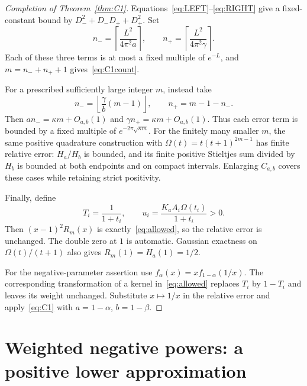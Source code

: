 \documentclass[11pt]{article}
\numberwithin{equation}{section}
\begin{document}
\begin{proof}[Completion of Theorem~\ref{thm:C1}]
Equations~\eqref{eq:LEFT}--\eqref{eq:RIGHT} give a fixed-constant bound
by $D_-^2+D_-D_++D_+^2$. Set
\begin{equation}\label{eq:allocationL}
 n_-=\left\lceil\frac{L^2}{4\pi^2a}\right\rceil,
 \qquad n_+=\left\lceil\frac{L^2}{4\pi^2\gamma}\right\rceil.
\end{equation}
Each of these three terms is at most a fixed multiple of $e^{-L}$,
and $m=n_-+n_++1$ gives~\eqref{eq:C1count}.

For a prescribed sufficiently large integer $m$, instead take
\[
 n_-=\left\lfloor\frac\gamma b(m-1)\right\rfloor,
 \qquad n_+=m-1-n_-.
\]
Then $a n_- =\kappa m+O_{a,b}(1)$ and
$\gamma n_+=\kappa m+O_{a,b}(1)$. Thus each error term is bounded by
a fixed multiple of $e^{-2\pi\sqrt{\kappa m}}$.
For the finitely many smaller $m$, the same positive quadrature
construction with $\Omega(t)=t(t+1)^{2m-1}$ has finite relative error:
$H_a/H_b$ is bounded, and its finite positive Stieltjes sum divided by
$H_b$ is bounded at both endpoints and on compact intervals.
Enlarging $C_{a,b}$ covers these cases while retaining strict positivity.

Finally, define
\[
 T_i=\frac1{1+t_i},\qquad
 u_i=\frac{K_a A_i\Omega(t_i)}{1+t_i}>0.
\]
Then $(x-1)^2R_m(x)$ is exactly~\eqref{eq:allowed}, so the relative
error is unchanged. The double zero at $1$ is automatic. Gaussian
exactness on $\Omega(t)/(t+1)$ also gives $R_m(1)=H_a(1)=1/2$.

For the negative-parameter assertion use
$f_\alpha(x)=x f_{1-\alpha}(1/x)$. The corresponding transformation
of a kernel in~\eqref{eq:allowed} replaces $T_i$ by $1-T_i$ and
leaves its weight unchanged. Substitute $x\mapsto1/x$ in the relative
error and apply~\eqref{eq:C1} with $a=1-\alpha$, $b=1-\beta$.
\end{proof}

\section{Weighted negative powers: a positive lower approximation}
\end{document}
